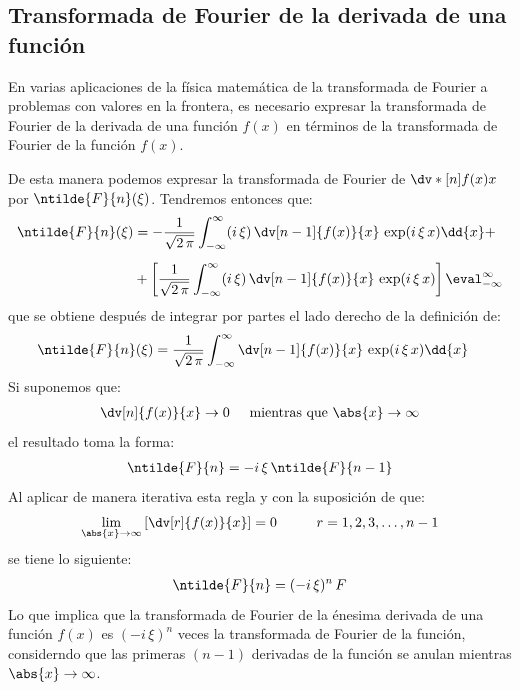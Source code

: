 \subsection{Transformada de Fourier de la derivada de una función}

En varias aplicaciones de la física matemática de la transformada de Fourier a problemas con valores en la frontera, es necesario expresar la transformada de Fourier de la derivada de una función $f(x)$ en términos de la transformada de Fourier de la función $f(x)$.
\par
De esta manera podemos expresar la transformada de Fourier de \hfill \break
$\dv*[n]{f(x)}{x}$ por $\ntilde{F}{n} (\xi)$. Tendremos entonces que:
\begin{align*}
\ntilde{F}{n}(\xi) &= -\dfrac{1}{\sqrt{2 \, \pi}} \int_{-\infty}^{\infty} (i \, \xi) \, \dv[n-1]{f(x)}{x} \, \exp(i \, \xi \, x) \dd{x} + \\[0.5em]
&+ \left[ \dfrac{1}{\sqrt{2 \, \pi}} \int_{-\infty}^{\infty} (i \, \xi) \, \dv[n-1]{f(x)}{x} \, \exp(i \, \xi \, x) \right] \eval_{-\infty}^{\infty}
\end{align*}
que se obtiene después de integrar por partes el lado derecho de la definición de:
\begin{align}
\ntilde{F}{n}(\xi) &= \dfrac{1}{\sqrt{2 \, \pi}} \int_{-\infty}^{\infty} \dv[n-1]{f(x)}{x} \, \exp(i \, \xi \, x) \dd{x}
\label{eq:ecuacion_01_36}
\end{align}
Si suponemos que:
\begin{align*}
\dv[n]{f(x)}{x} \to 0 \hspace{0.5cm} \mbox{mientras que  } \abs{x} \to \infty
\end{align*}
el resultado toma la forma:
\begin{align*}
\ntilde{F}{n} = - i \, \xi \, \ntilde{F}{n-1}
\end{align*}
Al aplicar de manera iterativa esta regla y con la suposición de que:
\begin{align*}
\lim_{\abs{x} \to \infty} \left[ \dv[r]{f(x)}{x} \right] = 0 \hspace{1cm} r = 1, 2, 3, \ldots, n-1
\end{align*}
se tiene lo siguiente:
\begin{align*}
\ntilde{F}{n} = (- i \, \xi)^{n} \, F
\end{align*}
Lo que implica que la transformada de Fourier de la énesima derivada de una función $f(x)$ es $(- i \, \xi)^{n}$ veces la transformada de Fourier de la función, considerndo que las primeras $(n - 1)$ derivadas de la función se anulan mientras $\abs{x} \to \infty$.

